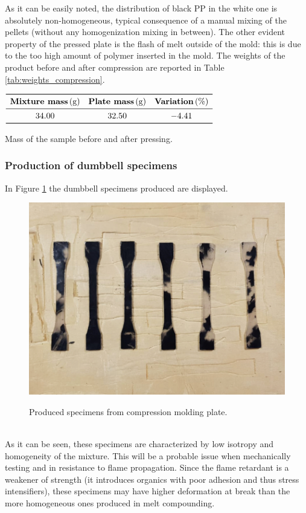 \documentclass[a4paper, 11pt]{article}
\begin{document}
As it can be easily noted, the distribution of black PP in the white one is absolutely non-homogeneous, typical consequence of a manual mixing of the pellets (without any homogenization mixing in between). The other evident property of the pressed plate is the flash of melt outside of the mold: this is due to the too high amount of polymer inserted in the mold. 
The weights of the product before and after compression are reported in Table \ref{tab:weights_compression}. 

\begin{table}[htp]
	\centering
	$
	\begin{array}{ccc}
	\toprule
	\textbf{Mixture mass}\,\text{(g)} & \textbf{Plate mass}\,\text{(g)} & \textbf{Variation}\,\text{(\%)} \\
	\midrule
	34.00 & 32.50 & -4.41\\
	\bottomrule
	\end{array}
	$
	\caption{Mass of the sample before and after pressing.}
	\label{tab:weights_comparison}
\end{table}

\subsubsection{Production of dumbbell specimens}

In Figure \ref{fig:dumbbell} the dumbbell specimens produced are displayed. 
\begin{figure}[htp]
	\centering
	\includegraphics[scale=0.3]
	{PHOTO-2019-05-23-17-37-07.jpg}
	\label{fig:dumbbell}
	\caption{Produced specimens from compression molding plate.}
\end{figure}\\
As it can be seen, these specimens are characterized by low isotropy and homogeneity of the mixture. This will be a probable issue when mechanically testing and in resistance to flame propagation. Since the flame retardant is a weakener of strength (it introduces organics with poor adhesion and thus stress intensifiers), these specimens may have higher deformation at break than the more homogeneous ones produced in melt compounding. 
\end{document}
